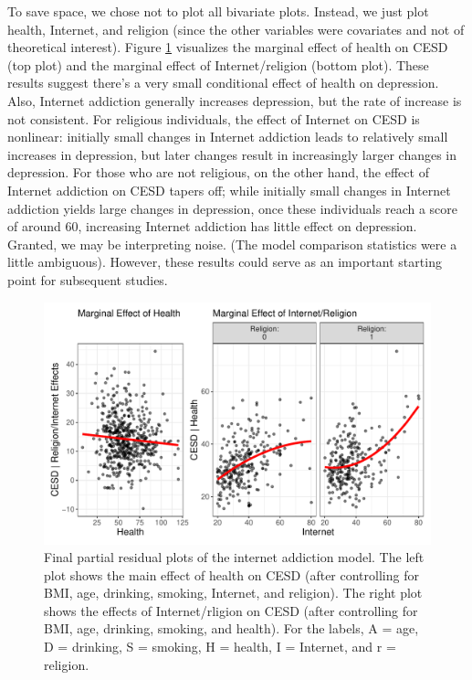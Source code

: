 \documentclass[
  man,floatsintext]{apa6}
\begin{document}
To save space, we chose not to plot all bivariate plots. Instead, we just plot health, Internet, and religion (since the other variables were covariates and not of theoretical interest). Figure \ref{fig:prpfinalexample} visualizes the marginal effect of health on CESD (top plot) and the marginal effect of Internet/religion (bottom plot). These results suggest there's a very small conditional effect of health on depression. Also, Internet addiction generally increases depression, but the rate of increase is not consistent. For religious individuals, the effect of Internet on CESD is nonlinear: initially small changes in Internet addiction leads to relatively small increases in depression, but later changes result in increasingly larger changes in depression. For those who are not religious, on the other hand, the effect of Internet addiction on CESD tapers off; while initially small changes in Internet addiction yields large changes in depression, once these individuals reach a score of around 60, increasing Internet addiction has little effect on depression. Granted, we may be interpreting noise. (The model comparison statistics were a little ambiguous). However, these results could serve as an important starting point for subsequent studies.

\begin{figure}

{\centering \includegraphics{visual_partitions_files/figure-latex/prpfinalexample-1} 

}

\caption{Final partial residual plots of the internet addiction model. The left plot shows the main effect of health on CESD (after controlling for BMI, age, drinking, smoking, Internet, and religion). The right plot shows the effects of Internet/rligion on CESD (after controlling for BMI, age, drinking, smoking, and health). For the labels, A = age, D = drinking, S = smoking, H = health, I = Internet, and r = religion.}\label{fig:prpfinalexample}
\end{figure}
\end{document}
